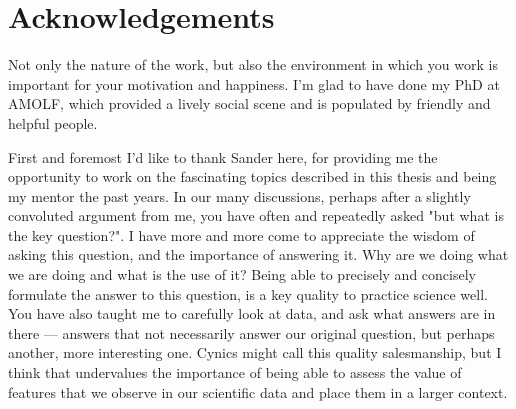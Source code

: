 



\chapter*{Acknowledgements}

Not only the nature of the work, but also the environment in which you work is important for your motivation and happiness.
%
I'm glad to have done my PhD at AMOLF, which provided 
a lively social scene and
is populated by friendly and helpful people.


First and foremost I'd like to thank Sander here, 
for providing me the opportunity to work on the fascinating topics described in this thesis and being my mentor the past years.
%
In our many discussions,
perhaps after a slightly convoluted argument from me,  
you have often and repeatedly asked "but what is the key question?".
%
I have more and more come to appreciate the wisdom of asking this question, 
and the importance of answering it.
Why are we doing what we are doing and what is the use of it?
Being able to precisely and concisely formulate the answer to this question, 
is a key quality to practice science well. 
%
You have also taught me to carefully look at data,
and ask what answers are in there --- 
answers that not necessarily answer our original question,
but perhaps another, more interesting one. 
%
Cynics might call this quality salesmanship,
but I think that undervalues the importance
of being able to assess the value of features that we observe in our scientific data and place them in a larger context.


